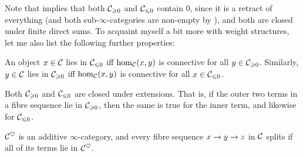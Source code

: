 \documentclass[a4paper, 10pt, oneside, DIV=9, chapterprefix=true, numbers=enddot,bibliography=totoc]{scrbook}
\begin{document}
Note that  implies that both $\mathcal{C}_{\geqslant 0}$ and $\mathcal{C}_{\leqslant 0}$ contain $0$, since it is a retract of everything (and both sub-$\infty$-categories are non-empty by ), and both are closed under finite direct sums. To acquaint myself a bit more with weight structures, let me also list the following further properties:
\begin{lem*}\label{lem*:MoreOnHearts}
	\begin{alphanumerate}
		\item An object $x\in \mathcal{C}$ lies in $\mathcal{C}_{\leqslant 0}$ iff $\hom_{\mathcal{C}}(x,y)$ is connective for all $y\in \mathcal{C}_{\geqslant 0}$. Similarly, $y\in \mathcal{C}$ lies in $\mathcal{C}_{\geqslant 0}$ iff $\hom_{\mathcal{C}}(x,y)$ is connective for all $x\in \mathcal{C}_{\leqslant 0}$.
		\item Both $\mathcal{C}_{\geqslant 0}$ and $\mathcal{C}_{\leqslant 0}$ are closed under extensions. That is, if the outer two terms in a fibre sequence lie in $\mathcal{C}_{\geqslant 0}$, then the same is true for the inner term, and likewise for  $\mathcal{C}_{\leqslant 0}$.
		\item $\mathcal{C}^\heartsuit$ is an additive $\infty$-category, and every fibre sequence $x\morphism y\morphism z$ in $\mathcal{C}$ splits if all of its terms lie in $\mathcal{C}^\heartsuit$.
	\end{alphanumerate}
\end{lem*}
\end{document}
